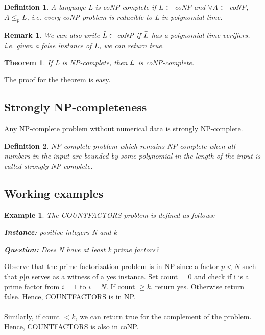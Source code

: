 \documentclass[12pt]{article}
\newtheorem{definition}{Definition}
\newtheorem{theorem}{Theorem}
\newtheorem*{remark}{Remark}
\newtheorem{example}{Example}
\begin{document}
\begin{definition}
    A language L is coNP-complete if $L \in $ coNP and $\forall A \in$ coNP, $A \leq_p L$, i.e. every coNP problem is reducible to L in polynomial time.
\end{definition}

\begin{remark}
    We can also write $\Bar{L} \in $ coNP if $\Bar{L}$ has a polynomial time verifiers. i.e. given a false instance of $L$, we can return true.
\end{remark}

\begin{theorem}
    If L is NP-complete, then $\Bar{L}$ is coNP-complete.
\end{theorem}

The proof for the theorem is easy.

\subsection{Strongly NP-completeness}

Any NP-complete problem without numerical data is strongly NP-complete.

\begin{definition}
    NP-complete problem which remains NP-complete when all numbers in the input are bounded by some polynomial in the length of the input is called strongly NP-complete.
\end{definition}

\subsection{Working examples}

\begin{example}
    The COUNTFACTORS problem is defined as follows:
    \par \textbf{Instance:} positive integers N and k
    \par \textbf{Question:} Does N have at least k prime factors?
\end{example}

\noindent Observe that the prime factorization problem is in NP since a factor $p < N$ such that $p | n$ serves as a witness of a yes instance. Set count = 0 and check if i is a prime factor from $i = 1$ to $i = N$. If count $\geq k$, return yes. Otherwise return false. Hence, COUNTFACTORS is in NP.
\\
\\Similarly, if count $< k$, we can return true for the complement of the problem. Hence, COUNTFACTORS is also in coNP.
\end{document}
